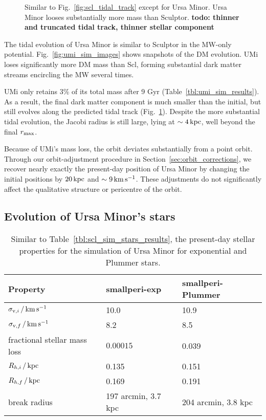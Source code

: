 \begin{figure}
\centering
{}
\caption[Ursa Minor tidal tracks]{Similar to
Fig.~\ref{fig:scl_tidal_track} except for Ursa Minor. Ursa Minor looses
substantially more mass than Sculptor. \textbf{todo: thinner and
truncated tidal track, thinner stellar
component}}\label{fig:umi_tidal_track}
\end{figure}

The tidal evolution of Ursa Minor is similar to Sculptor in the MW-only
potential. Fig.~\ref{fig:umi_sim_images} shows snapshots of the DM
evolution. UMi loses significantly more DM mass than Scl, forming
substantial dark matter streams encircling the MW several times.

UMi only retains 3\% of its total mass after 9 Gyr
(Table~\ref{tbl:umi_sim_results}). As a result, the final dark matter
component is much smaller than the initial, but still evolves along the
predicted tidal track (Fig.~\ref{fig:umi_tidal_track}). Despite the more
substantial tidal evolution, the Jacobi radius is still large, lying at
\(\sim 4\,{\rm kpc}\), well beyond the final \(r_{\rm max}\).

Because of UMi's mass loss, the orbit deviates substantially from a
point orbit. Through our orbit-adjustment procedure in
Section~\ref{sec:orbit_corrections}, we recover nearly exactly the
present-day position of Ursa Minor by changing the initial positions by
\(20\,{\rm kpc}\) and \(\sim 9\,{\rm km\,s^{-1}}\). These adjustments do not
significantly affect the qualitative structure or pericentre of the
orbit.

\subsection{Evolution of Ursa Minor's
stars}\label{evolution-of-ursa-minors-stars}

\begin{table*}[t]
\centering
\caption[Simulation results for Ursa Minor’s stars]{Similar to Table \ref{tbl:scl_sim_stars_results}, the present-day stellar properties for the simulation of Ursa Minor for exponential and Plummer stars. }
\label{tbl:umi_sim_stars_results}
\begin{tabular}{lll}
\toprule
Property & smallperi-exp & smallperi-Plummer\\
\midrule
$\sigma_{{\rm v}, i}\,/\,{\rm km\,s^{-1}}$ & 10.0 & 10.9\\
$\sigma_{{\rm v}, f}\,/\,{\rm km\,s^{-1}}$ & 8.2 & 8.5\\
fractional stellar mass loss & $0.00015$ & 0.039\\
$R_{h, i}\,/\,{\rm kpc}$ & 0.135 & 0.151\\
$R_{h, f}\,/\,{\rm kpc}$ & 0.169 & 0.191\\
break radius & 197 arcmin, 3.7 kpc & 204 arcmin, 3.8 kpc\\
\bottomrule
\end{tabular}
\end{table*}

